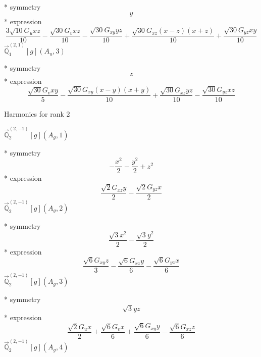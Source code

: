 \documentclass[fleqn,8pt]{jsarticle}
\begin{document}
\noindent\quad ** symmetry
\begin{dmath*}
y
\end{dmath*}
\noindent\quad ** expression
\begin{dmath*}
\frac{3 \sqrt{10} G_{u} x z}{10} - \frac{\sqrt{30} G_{v} x z}{10} - \frac{\sqrt{30} G_{xy} y z}{10} + \frac{\sqrt{30} G_{xz} \left(x - z\right) \left(x + z\right)}{10} + \frac{\sqrt{30} G_{yz} x y}{10}
\end{dmath*}
\noindent\quad $\vec{\mathbb{Q}}_{1}^{(2,1)}[g](A_{u},3)$

\noindent\quad ** symmetry
\begin{dmath*}
z
\end{dmath*}
\noindent\quad ** expression
\begin{dmath*}
\frac{\sqrt{30} G_{v} x y}{5} - \frac{\sqrt{30} G_{xy} \left(x - y\right) \left(x + y\right)}{10} + \frac{\sqrt{30} G_{xz} y z}{10} - \frac{\sqrt{30} G_{yz} x z}{10}
\end{dmath*}

\noindent * Harmonics for rank 2

\noindent\quad $\vec{\mathbb{Q}}_{2}^{(2,-1)}[g](A_{g},1)$

\noindent\quad ** symmetry
\begin{dmath*}
- \frac{x^{2}}{2} - \frac{y^{2}}{2} + z^{2}
\end{dmath*}
\noindent\quad ** expression
\begin{dmath*}
\frac{\sqrt{2} G_{xz} y}{2} - \frac{\sqrt{2} G_{yz} x}{2}
\end{dmath*}
\noindent\quad $\vec{\mathbb{Q}}_{2}^{(2,-1)}[g](A_{g},2)$

\noindent\quad ** symmetry
\begin{dmath*}
\frac{\sqrt{3} x^{2}}{2} - \frac{\sqrt{3} y^{2}}{2}
\end{dmath*}
\noindent\quad ** expression
\begin{dmath*}
\frac{\sqrt{6} G_{xy} z}{3} - \frac{\sqrt{6} G_{xz} y}{6} - \frac{\sqrt{6} G_{yz} x}{6}
\end{dmath*}
\noindent\quad $\vec{\mathbb{Q}}_{2}^{(2,-1)}[g](A_{g},3)$

\noindent\quad ** symmetry
\begin{dmath*}
\sqrt{3} y z
\end{dmath*}
\noindent\quad ** expression
\begin{dmath*}
\frac{\sqrt{2} G_{u} x}{2} + \frac{\sqrt{6} G_{v} x}{6} + \frac{\sqrt{6} G_{xy} y}{6} - \frac{\sqrt{6} G_{xz} z}{6}
\end{dmath*}
\noindent\quad $\vec{\mathbb{Q}}_{2}^{(2,-1)}[g](A_{g},4)$
\end{document}
